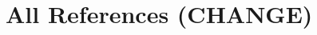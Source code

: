 \section{All References (CHANGE)}

\cite{DCUref}
\cite{galliano2009ester}
\cite{rouvier2013open}
\cite{meignier2010lium}
\cite{ortega2016albayzin}
\cite{tranter2004speaker}
\cite{johnson1999spoken}
\cite{bimbot1993text}
\cite{alohab2016tavarez}
\cite{eurecom2016patino}
\cite{NIST2006web}
\cite{NIST2009web}
